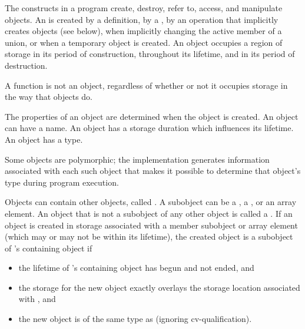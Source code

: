 \pnum
{}%
The constructs in a \Cpp{} program create, destroy, refer to, access, and
manipulate objects.
An  is created
by a definition,
by a ,
by an operation that implicitly creates objects (see below),
when implicitly changing the active member of a union,
or
when a temporary object is created.
An object occupies a region of storage
in its period of construction,
throughout its lifetime,
and
in its period of destruction.
\begin{note}
A function is not an object, regardless of whether or not it
occupies storage in the way that objects do.
\end{note}
The properties of an
object are determined when the object is created. An object can have a
name. An object has a storage
duration which influences its
lifetime. An object has a
type.
\begin{note}
Some objects are
polymorphic; the implementation
generates information associated with each such object that makes it
possible to determine that object's type during program execution.
\end{note}

\pnum
{}%
Objects can contain other objects, called .
A subobject can be
a , a ,
or an array element.
%
An object that is not a subobject of any other object is called a .
If an object is created
in storage associated with a member subobject or array element 
(which may or may not be within its lifetime),
the created object
is a subobject of 's containing object if
\begin{itemize}
\item
the lifetime of 's containing object has begun and not ended, and
\item
the storage for the new object exactly overlays the storage location associated with , and
\item
the new object is of the same type as  (ignoring cv-qualification).
\end{itemize}

